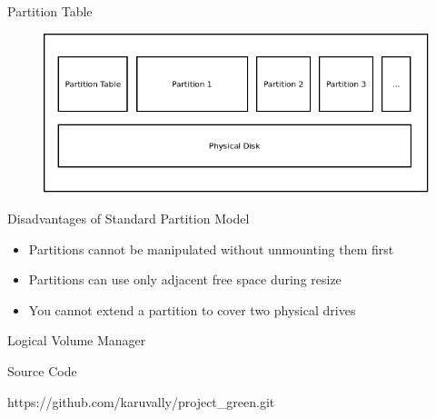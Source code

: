 \documentclass{beamer}
\begin{document}
\begin{frame}{Partition Table}
    \begin{figure}
        \includegraphics[scale=0.5]{partitions.png}
    \end{figure}
\end{frame}

\begin{frame}{Disadvantages of Standard Partition Model}
    \begin{itemize}
        \item<2-> Partitions cannot be manipulated without unmounting them first
        \item<3-> Partitions can use only adjacent free space during resize
        \item<4-> You cannot extend a partition to cover two physical drives
    \end{itemize}
\end{frame}

\begin{frame}{Logical Volume Manager}
\end{frame}

\begin{frame}{Source Code} 
    \begin{center}
        \large https://github.com/karuvally/project\_green.git
    \end{center}
\end{frame}
\end{document}
